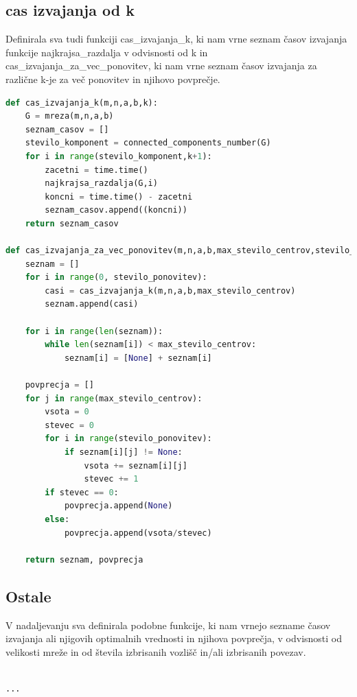 \documentclass[a4paper]{article}
\begin{document}
\subsection{cas izvajanja od k}
Definirala sva tudi funkciji cas\_izvajanja\_k, ki nam vrne seznam časov izvajanja funkcije najkrajsa\_razdalja v odvisnosti od k in cas\_izvajanja\_za\_vec\_ponovitev,  ki nam vrne seznam časov izvajanja za različne k-je za več ponovitev in njihovo povprečje.

\begin{lstlisting}[language=Python]
def cas_izvajanja_k(m,n,a,b,k):
    G = mreza(m,n,a,b)
    seznam_casov = []
    stevilo_komponent = connected_components_number(G)
    for i in range(stevilo_komponent,k+1):
        zacetni = time.time()
        najkrajsa_razdalja(G,i)
        koncni = time.time() - zacetni
        seznam_casov.append((koncni))
    return seznam_casov

def cas_izvajanja_za_vec_ponovitev(m,n,a,b,max_stevilo_centrov,stevilo_ponovitev):
    seznam = []
    for i in range(0, stevilo_ponovitev):
        casi = cas_izvajanja_k(m,n,a,b,max_stevilo_centrov)
        seznam.append(casi)

    for i in range(len(seznam)):
        while len(seznam[i]) < max_stevilo_centrov:
            seznam[i] = [None] + seznam[i]

    povprecja = []
    for j in range(max_stevilo_centrov):
        vsota = 0
        stevec = 0
        for i in range(stevilo_ponovitev):
            if seznam[i][j] != None:
                vsota += seznam[i][j]
                stevec += 1
        if stevec == 0:
            povprecja.append(None)
        else:
            povprecja.append(vsota/stevec)
           
    return seznam, povprecja

\end{lstlisting}

\subsection{Ostale}
V nadaljevanju sva definirala podobne funkcije, ki nam vrnejo sezname časov izvajanja ali njigovih optimalnih vrednosti in njihova povprečja, v odvisnosti od velikosti mreže in od števila izbrisanih vozlišč in/ali izbrisanih povezav.

\begin{lstlisting}[language=Python]

...
\end{lstlisting}
\end{document}
